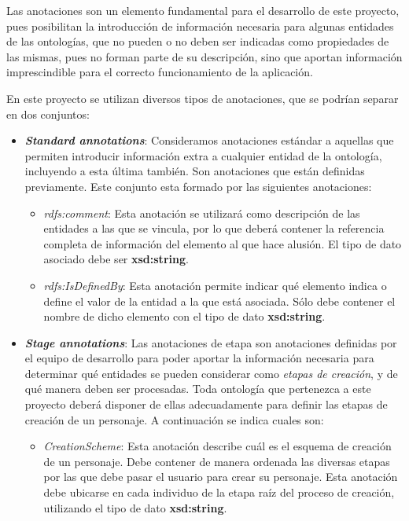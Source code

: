 Las anotaciones son un elemento fundamental para el desarrollo de este proyecto, pues posibilitan la introducción de 
información necesaria para algunas entidades de las ontologías, que no pueden o no deben ser indicadas como propiedades 
de las mismas, pues no forman parte de su descripción, sino que aportan información 
imprescindible para el correcto funcionamiento de la aplicación.\medskip

En este proyecto se utilizan diversos tipos de anotaciones, que se podrían separar en dos conjuntos:
\begin{itemize}
    \item \textit{\textbf{Standard annotations}}: Consideramos anotaciones estándar a aquellas que permiten introducir 
    información extra a cualquier entidad de la ontología, incluyendo a esta última también. Son anotaciones que están 
    definidas previamente. Este conjunto esta formado por las siguientes anotaciones:

    \begin{itemize}
        
        \item \textit{rdfs:comment}: Esta anotación se utilizará como descripción de las entidades a las que se vincula, por lo que 
        deberá contener la referencia completa de información del elemento al que hace alusión. El tipo de dato asociado debe ser 
        \textbf{xsd:string}.

        \item \textit{rdfs:IsDefinedBy}: Esta anotación permite indicar qué elemento indica o define el valor 
        de la entidad a la que está asociada. Sólo debe contener el nombre de dicho elemento con el tipo de dato \textbf{xsd:string}.
    \end{itemize}

    \item \textit{\textbf{Stage annotations}}: Las anotaciones de etapa son anotaciones definidas por el equipo de desarrollo 
    para poder aportar la información necesaria para determinar qué entidades se pueden considerar como \textit{etapas de creación}, 
    y de qué manera deben ser procesadas. Toda ontología que pertenezca a este proyecto deberá disponer de ellas adecuadamente para 
    definir las etapas de creación de un personaje. A continuación se indica cuales son:

    \begin{itemize}
        \item \textit{CreationScheme}: Esta anotación describe cuál es el esquema de creación de un personaje. Debe contener 
        de manera ordenada las diversas etapas por las que debe pasar el usuario para crear su personaje. Esta anotación 
        debe ubicarse en cada individuo de la etapa raíz del proceso de creación, utilizando el tipo de dato \textbf{xsd:string}.


\end{itemize}
\end{itemize}
